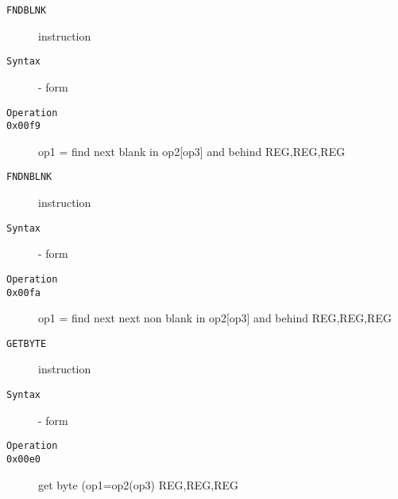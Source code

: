 \clearpage
\begin{description}
\item[\texttt{FNDBLNK}] instruction\\
\item[\texttt{Syntax}] - form \\

\item[\texttt{Operation}]
\item[\texttt{}]
\item[\texttt{0x00f9}] op1 = find next blank in op2[op3] and behind  {REG,REG,REG}       \\
\end{description}
\clearpage
\begin{description}
\item[\texttt{FNDNBLNK}] instruction\\
\item[\texttt{Syntax}] - form \\

\item[\texttt{Operation}]
\item[\texttt{}]
\item[\texttt{0x00fa}] op1 = find next next non blank in op2[op3] and behind  {REG,REG,REG}       \\
\end{description}
\clearpage
\begin{description}
\item[\texttt{GETBYTE}] instruction\\
\item[\texttt{Syntax}] - form \\

\item[\texttt{Operation}]
\item[\texttt{}]
\item[\texttt{0x00e0}] get byte  (op1=op2(op3)  {REG,REG,REG}       \\
\end{description}
